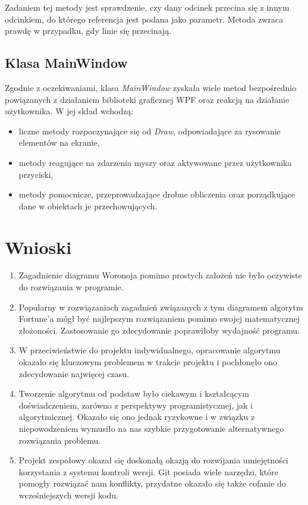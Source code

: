 \documentclass[a4paper,12pt]{article}
\newcommand\tab[1][0.6cm]{\hspace*{#1}}
\begin{document}
Zadaniem tej metody jest sprawdzenie, czy dany odcinek przecina się z innym odcinkiem, do którego referencja jest podana jako parametr. Metoda zwraca prawdę w przypadku, gdy linie się przecinają.

\subsection{Klasa MainWindow} 

\tab Zgodnie z oczekiwaniami, klasa \textit{MainWindow} zyskała wiele metod bezpośrednio powiązanych z działaniem biblioteki graficznej WPF oraz reakcją na działanie użytkownika. W jej skład wchodzą: 

\begin{itemize}
\item liczne metody rozpoczynające się od \textit{Draw}, odpowiadające za rysowanie elementów na ekranie,
\item metody reagujące na zdarzenia myszy oraz aktywowane przez użytkownika przyciski,
\item metody pomocnicze, przeprowadzające drobne obliczenia oraz porządkujące dane w obiektach je przechowujących.
\end{itemize}

\section{Wnioski}

\begin{enumerate}

\item Zagadnienie diagramu Woronoja pomimo prostych założeń nie było oczywiste do rozwiązania w programie.

\item Popularny w rozwiązaniach zagadnień związanych z tym diagramem algorytm Fortune'a mógł być najlepszym rozwiązaniem pomimo swojej matematycznej złożoności. Zastosowanie go zdecydowanie poprawiłoby wydajność programu.

\item W przeciwieństwie do projektu indywidualnego, opracowanie algorytmu okazało się kluczowym problemem w trakcie projektu i pochłonęło ono zdecydowanie najwięcej czasu.

\item Tworzenie algorytmu od podstaw było ciekawym i kształcącym doświadczeniem, zarówno z perspektywy programistycznej, jak i algorytmicznej. Okazało się ono jednak ryzykowne i w związku z niepowodzeniem wymusiło na nas szybkie przygotowanie alternatywnego rozwiązania problemu.

\item Projekt zespołowy okazał się doskonałą okazją do rozwijania umiejętności korzystania z systemu kontroli wersji. Git posiada wiele narzędzi, które pomogły rozwiązać nam konflikty, przydatne okazało się także cofanie do wcześniejszych wersji kodu.

\end{enumerate}
\end{document}
